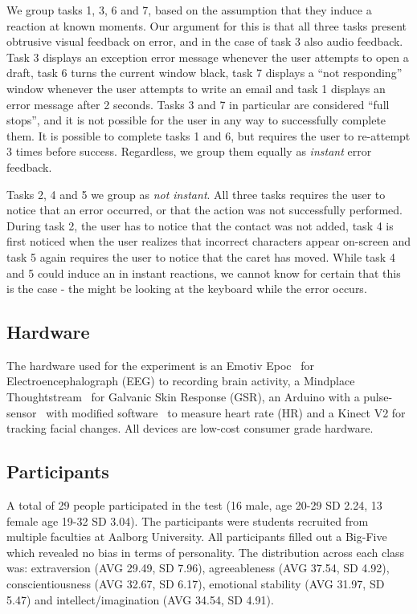 We group tasks 1, 3, 6 and 7, based on the assumption that they induce a reaction at known moments. Our argument for
this is that all three tasks present obtrusive visual feedback on error, and in the case of task 3 also audio
feedback. Task 3 displays an exception error message whenever the user attempts to open a draft, task 6 turns the
current window
black, task 7 displays a ``not responding'' window whenever the user attempts to write an email and task 1 displays an
error message after 2 seconds. Tasks 3 and 7 in particular are considered ``full stops'', and it is not possible for the
user in any way to successfully complete them. It is possible to complete tasks 1 and 6, but requires the user to
re-attempt 3 times before success. Regardless, we group them equally as \textit{instant} error feedback.

Tasks 2, 4 and 5 we group as \textit{not instant}. All three tasks requires the user to notice that an error occurred, or
that the action was not successfully performed. During task 2, the user has to notice that the contact was not added,
task 4 is first noticed when the user realizes that incorrect characters appear on-screen and task 5 again requires the
user to notice that the caret has moved. While task 4 and 5 could induce an in instant reactions, we cannot know for
certain that this is the case - the might be looking at the keyboard while the error occurs.

\subsection{Hardware}
The hardware used for the experiment is an Emotiv Epoc~\cite{emotiv_epoc_website} for Electroencephalograph (EEG) to recording brain activity, a Mindplace Thoughtstream~\cite{thoughtstream} for Galvanic Skin Response (GSR), an Arduino with a pulse-sensor~\cite{pulsesensor} with modified software~\cite{pulsesensorgit} to measure heart rate (HR) and a Kinect V2\cite{kinect_specs3} for tracking facial changes.
All devices are low-cost consumer grade hardware.

\subsection{Participants}
A total of 29 people participated in the test (16 male, age 20-29 SD 2.24, 13 female age 19-32 SD 3.04).
The participants were students recruited from multiple faculties at Aalborg University. 
All participants filled out a Big-Five\cite{big5} which revealed no bias in terms of personality. 
The distribution across each class was: extraversion (AVG 29.49, SD 7.96), agreeableness (AVG 37.54, SD 4.92), conscientiousness (AVG 32.67, SD 6.17), emotional stability (AVG 31.97, SD 5.47) and intellect/imagination (AVG 34.54, SD 4.91).

